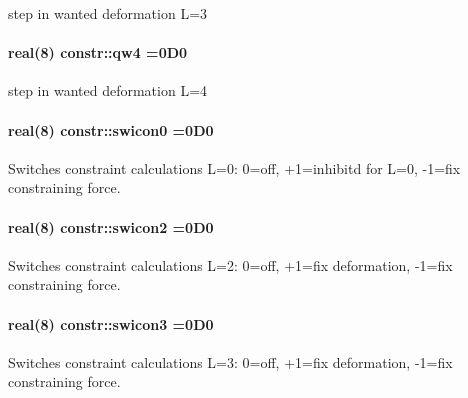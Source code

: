 step in wanted deformation L=3 

\paragraph[{\texorpdfstring{qw4}{qw4}}]{\setlength{\rightskip}{0pt plus 5cm}real(8) constr\+::qw4 =0\+D0}\hypertarget{namespaceconstr_adcfe684411ef071acb9b6f175ab03de9}{}\label{namespaceconstr_adcfe684411ef071acb9b6f175ab03de9}


step in wanted deformation L=4 

\paragraph[{\texorpdfstring{swicon0}{swicon0}}]{\setlength{\rightskip}{0pt plus 5cm}real(8) constr\+::swicon0 =0\+D0}\hypertarget{namespaceconstr_ad537476e003e8f1e0d92299966b5fe70}{}\label{namespaceconstr_ad537476e003e8f1e0d92299966b5fe70}


Switches constraint calculations L=0\+: 0=off, +1=inhibitd for L=0, -\/1=fix constraining force. 

\paragraph[{\texorpdfstring{swicon2}{swicon2}}]{\setlength{\rightskip}{0pt plus 5cm}real(8) constr\+::swicon2 =0\+D0}\hypertarget{namespaceconstr_a0206f7a3b7b30d7f3823f15aba53bae8}{}\label{namespaceconstr_a0206f7a3b7b30d7f3823f15aba53bae8}


Switches constraint calculations L=2\+: 0=off, +1=fix deformation, -\/1=fix constraining force. 

\paragraph[{\texorpdfstring{swicon3}{swicon3}}]{\setlength{\rightskip}{0pt plus 5cm}real(8) constr\+::swicon3 =0\+D0}\hypertarget{namespaceconstr_ae14b0fb5921536040dba512c7afc82fb}{}\label{namespaceconstr_ae14b0fb5921536040dba512c7afc82fb}


Switches constraint calculations L=3\+: 0=off, +1=fix deformation, -\/1=fix constraining force. 

